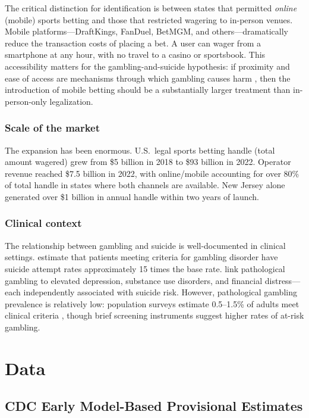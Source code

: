 \documentclass[12pt]{article}
\begin{document}
The critical distinction for identification is between states that permitted \textit{online} (mobile) sports betting and those that restricted wagering to in-person venues. Mobile platforms---DraftKings, FanDuel, BetMGM, and others---dramatically reduce the transaction costs of placing a bet. A user can wager from a smartphone at any hour, with no travel to a casino or sportsbook. This accessibility matters for the gambling-and-suicide hypothesis: if proximity and ease of access are mechanisms through which gambling causes harm \citep{welte2004}, then the introduction of mobile betting should be a substantially larger treatment than in-person-only legalization.

\subsubsection*{Scale of the market} The expansion has been enormous. U.S.\ legal sports betting handle (total amount wagered) grew from \$5 billion in 2018 to \$93 billion in 2022. Operator revenue reached \$7.5 billion in 2022, with online/mobile accounting for over 80\% of total handle in states where both channels are available. New Jersey alone generated over \$1 billion in annual handle within two years of launch.

\subsubsection*{Clinical context} The relationship between gambling and suicide is well-documented in clinical settings. \citet{moghaddam2015} estimate that patients meeting criteria for gambling disorder have suicide attempt rates approximately 15 times the base rate. \citet{karlsson2006} link pathological gambling to elevated depression, substance use disorders, and financial distress---each independently associated with suicide risk. However, pathological gambling prevalence is relatively low: population surveys estimate 0.5--1.5\% of adults meet clinical criteria \citep{shaffer1999}, though brief screening instruments suggest higher rates of at-risk gambling.


\section{Data}

\subsection{CDC Early Model-Based Provisional Estimates}
\end{document}
